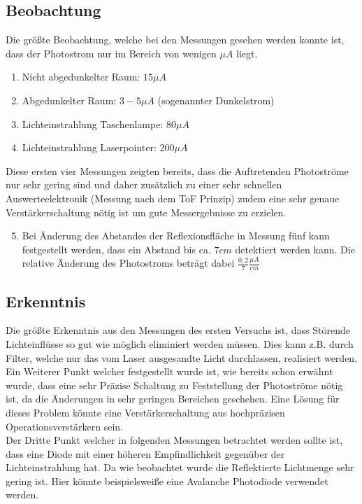 \subsection{Beobachtung}
Die größte Beobachtung, welche bei den Messungen gesehen werden konnte ist, dass der Photostrom nur im Bereich von wenigen $\mu A$ liegt.
\begin{enumerate}
	\item Nicht abgedunkelter Raum: $15\mu A$ 
	\item Abgedunkelter Raum: $3-5\mu A$  (sogenannter Dunkelstrom)
	\item Lichteinstrahlung Taschenlampe: $80\mu A$ 
	\item Lichteinstrahlung Laserpointer: $200\mu A$
\end{enumerate}
Diese ersten vier Messungen zeigten bereits, dass die Auftretenden Photoströme nur sehr gering sind und daher zusätzlich zu einer sehr schnellen Auswerteelektronik (Messung nach dem \ac{ToF} Prinzip) zudem eine sehr genaue Verstärkerschaltung nötig ist um gute Messergebnisse zu erzielen.
\begin{enumerate}
	\setcounter{enumi}{4}
	\item Bei Änderung des Abstandes der Reflexionsfläche in Messung fünf kann festgestellt werden, dass ein Abstand bis ca. $7cm$ detektiert werden kann. Die relative Änderung des Photostroms beträgt dabei $\frac{0,2}{7}\frac{\mu A}{cm}$
\end{enumerate}
\subsection{Erkenntnis}
Die größte Erkenntnis aus den Messungen des ersten Versuchs ist, dass Störende Lichteinflüsse so gut wie möglich eliminiert werden müssen. Dies kann z.B. durch Filter, welche nur das vom Laser ausgesandte Licht durchlassen, realisiert werden.\\
Ein Weiterer Punkt welcher festgestellt wurde ist, wie bereits schon erwähnt wurde, dass eine sehr Präzise Schaltung zu Feststellung der Photoströme nötig ist, da die Änderungen in sehr geringen Bereichen geschehen. Eine Lösung für dieses Problem könnte eine Verstärkerschaltung aus hochpräzisen Operationsverstärkern sein.\\
Der Dritte Punkt welcher in folgenden Messungen betrachtet werden sollte ist, dass eine Diode mit einer höheren Empfindlichkeit gegenüber der Lichteinstrahlung hat. Da wie beobachtet wurde die Reflektierte Lichtmenge sehr gering ist. Hier könnte beispielsweiße eine Avalanche Photodiode verwendet werden.

